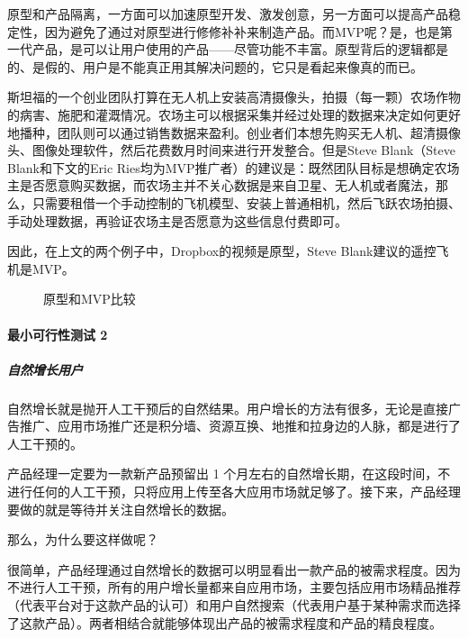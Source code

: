 \documentclass[letterpaper,11pt,english]{sphinxmanual}
\begin{document}
原型和产品隔离，一方面可以加速原型开发、激发创意，另一方面可以提高产品稳定性，因为避免了通过对原型进行修修补补来制造产品。而MVP呢？是，也是第一代产品，是可以让用户使用的产品——尽管功能不丰富。原型背后的逻辑都是的、是假的、用户是不能真正用其解决问题的，它只是看起来像真的而已。

斯坦福的一个创业团队打算在无人机上安装高清摄像头，拍摄（每一颗）农场作物的病害、施肥和灌溉情况。农场主可以根据采集并经过处理的数据来决定如何更好地播种，团队则可以通过销售数据来盈利。创业者们本想先购买无人机、超清摄像头、图像处理软件，然后花费数月时间来进行开发整合。但是Steve
Blank（Steve Blank和下文的Eric
Ries均为MVP推广者）的建议是：既然团队目标是想确定农场主是否愿意购买数据，而农场主并不关心数据是来自卫星、无人机或者魔法，那么，只需要租借一个手动控制的飞机模型、安装上普通相机，然后飞跃农场拍摄、手动处理数据，再验证农场主是否愿意为这些信息付费即可。

因此，在上文的两个例子中，Dropbox的视频是原型，Steve
Blank建议的遥控飞机是MVP。

\begin{figure}[H]
\centering
\capstart

\noindent{}
\caption{原型和MVP比较}\label{\detokenize{chapter_knowledge/MVP:id10}}\end{figure}


\paragraph{最小可行性测试 2\sphinxfootnotemark[548]}
\label{\detokenize{chapter_knowledge/MVP:id1}}%
\begin{footnotetext}[548]\sphinxAtStartFootnote
{}
%
\end{footnotetext}\ignorespaces 

\subparagraph{自然增长用户}
\label{\detokenize{chapter_knowledge/MVP:id2}}
自然增长就是抛开人工干预后的自然结果。用户增长的方法有很多，无论是直接广告推广、应用市场推广还是积分墙、资源互换、地推和拉身边的人脉，都是进行了人工干预的。

产品经理一定要为一款新产品预留出 1
个月左右的自然增长期，在这段时间，不进行任何的人工干预，只将应用上传至各大应用市场就足够了。接下来，产品经理要做的就是等待并关注自然增长的数据。

那么，为什么要这样做呢？

很简单，产品经理通过自然增长的数据可以明显看出一款产品的被需求程度。因为不进行人工干预，所有的用户增长量都来自应用市场，主要包括应用市场精品推荐（代表平台对于这款产品的认可）和用户自然搜索（代表用户基于某种需求而选择了这款产品）。两者相结合就能够体现出产品的被需求程度和产品的精良程度。
\end{document}
